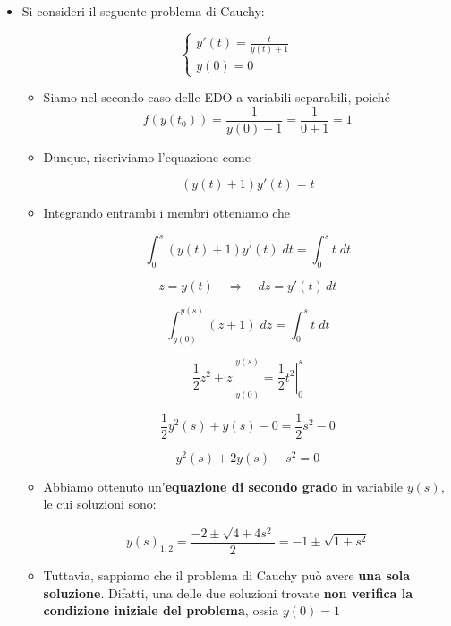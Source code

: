 \documentclass[a4paper, 12pt]{report}
\begin{document}
    \begin{itemize}
        \item Si consideri il seguente problema di Cauchy:
        
        $$
        \left \{ \begin{array}{l}
            y'(t) = \frac{t}{y(t)+1} \\
            y(0) = 0
        \end{array}\right .
        $$
        
        \begin{itemize}
            \item Siamo nel secondo caso delle EDO a variabili separabili, poiché 
            \[f(y(t_0)) = \frac{1}{y(0)+1} = \frac{1}{0+1} = 1\]
            
            \item Dunque, riscriviamo l'equazione come
            
            \[ (y(t)+1)y'(t) = t\]
            
            \item Integrando entrambi i membri otteniamo che
            
            \[ \int_{0}^{s} (y(t)+1)y'(t) \; dt = \int_{0}^{s} t \; dt\]
            
            \[ z = y(t) \quad \Longrightarrow \quad dz = y'(t) \, dt\]
            
            \[ \int_{y(0)}^{y(s)} (z+1) \; dz = \int_{0}^{s} t \; dt\]
            
            \[ \left . \frac{1}{2}z^2+z \right |_{y(0)}^{y(s)} = \left . \frac{1}{2}t^2 \right |_{0}^{s}\]
            
            \[ \frac{1}{2}y^2(s)+y(s) - 0 = \frac{1}{2} s^2 - 0\]
            
            \[ y^2(s) + 2y(s) - s^2 = 0 \]
            
            \item Abbiamo ottenuto un'\textbf{equazione di secondo grado} in variabile $y(s)$, le cui soluzioni sono:
            
            \[ y(s)_{1,2} = \frac{-2 \pm \sqrt{4+4s^2}}{2} = -1 \pm \sqrt{1+s^2}\]
            
            \item Tuttavia, sappiamo che il problema di Cauchy può avere \textbf{una sola soluzione}. Difatti, una delle due soluzioni trovate \textbf{non verifica la condizione iniziale del problema}, ossia $y(0) = 1$
            

\end{itemize}
\end{itemize}
\end{document}
